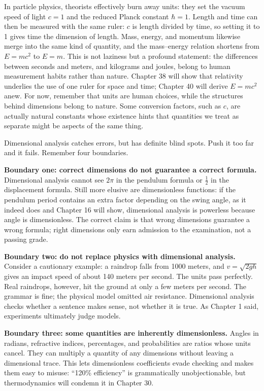 \begin{challenge}
In particle physics, theorists effectively burn away units: they set the vacuum speed of light $c = 1$ and the reduced Planck constant $\hbar = 1$. Length and time can then be measured with the same ruler: $c$ is length divided by time, so setting it to 1 gives time the dimension of length. Mass, energy, and momentum likewise merge into the same kind of quantity, and the mass--energy relation shortens from $E = mc^2$ to $E = m$. This is not laziness but a profound statement: the differences between seconds and meters, and kilograms and joules, belong to human measurement habits rather than nature. Chapter 38 will show that relativity underlies the use of one ruler for space and time; Chapter 40 will derive $E=mc^2$ anew. For now, remember that units are human choices, while the structures behind dimensions belong to nature. Some conversion factors, such as $c$, are actually natural constants whose existence hints that quantities we treat as separate might be aspects of the same thing.
\end{challenge}


Dimensional analysis catches errors, but has definite blind spots. Push it too far and it fails. Remember four boundaries.

\textbf{Boundary one: correct dimensions do not guarantee a correct formula.} Dimensional analysis cannot see $2\pi$ in the pendulum formula or $\frac{1}{2}$ in the displacement formula. Still more elusive are dimensionless functions: if the pendulum period contains an extra factor depending on the swing angle, as it indeed does and Chapter 16 will show, dimensional analysis is powerless because angle is dimensionless. The correct claim is that wrong dimensions guarantee a wrong formula; right dimensions only earn admission to the examination, not a passing grade.

\textbf{Boundary two: do not replace physics with dimensional analysis.} Consider a cautionary example: a raindrop falls from 1000 meters, and $v = \sqrt{2gh}$ gives an impact speed of about 140 meters per second. The units pass perfectly. Real raindrops, however, hit the ground at only a few meters per second. The grammar is fine; the physical model omitted air resistance. Dimensional analysis checks whether a sentence makes sense, not whether it is true. As Chapter 1 said, experiments ultimately judge models.

\textbf{Boundary three: some quantities are inherently dimensionless.} Angles in radians, refractive indices, percentages, and probabilities are ratios whose units cancel. They can multiply a quantity of any dimensions without leaving a dimensional trace. This lets dimensionless coefficients evade checking and makes them easy to misuse: ``120\% efficiency'' is grammatically unobjectionable, but thermodynamics will condemn it in Chapter 30.

